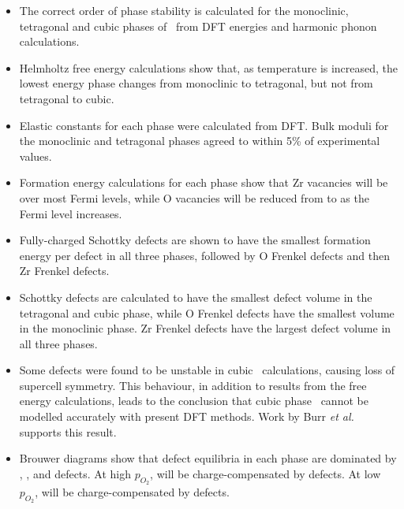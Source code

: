 \begin{itemize}
\item The correct order of phase stability is calculated for the monoclinic, tetragonal and cubic phases of \zirconia\ from DFT energies and harmonic phonon calculations. 
\item Helmholtz free energy calculations show that, as temperature is increased, the lowest energy phase changes from monoclinic to tetragonal, but not from tetragonal to cubic.
\item Elastic constants for each phase were calculated from DFT. Bulk moduli for the monoclinic and tetragonal phases agreed to within 5\% of experimental values. 
\item Formation energy calculations for each phase show that Zr vacancies will be  over most Fermi levels, while O vacancies will be reduced from  to  as the Fermi level increases.
\item Fully-charged Schottky defects are shown to have the smallest formation energy per defect in all three phases, followed by O Frenkel defects and then Zr Frenkel defects.
\item Schottky defects are calculated to have the smallest defect volume in the tetragonal and cubic phase, while O Frenkel defects have the smallest volume in the monoclinic phase. Zr Frenkel defects have the largest defect volume in all three phases.
\item Some defects were found to be unstable in cubic \zirconia\ calculations, causing loss of supercell symmetry. This behaviour, in addition to results from the free energy calculations, leads to the conclusion that cubic phase \zirconia\ cannot be modelled accurately with present DFT methods. Work by Burr \emph{et al.} \cite{burr2017importance} supports this result.
\item Brouwer diagrams show that defect equilibria in each phase are dominated by , ,  and  defects. At high $p_{O_{2}}$,  will be charge-compensated by  defects. At low $p_{O_{2}}$,  will be charge-compensated by  defects.
\end{itemize}